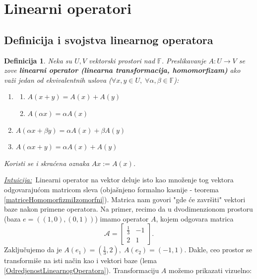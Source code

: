 \documentclass[a4paper,12pt,twoside]{report}
\newtheorem{definition}{Definicija}[section]
\numberwithin{algorithm}{section}
\newcommand{\intuicija}{\noindent\underline{\textit{Intuicija:}}\ }
\begin{document}
\newpage

\section{Linearni operatori}

\subsection{Definicija i svojstva linearnog operatora}
\label{linearniOperator}

\begin{definition}
    Neka su $U, V$ vektorski prostori nad $\mathbb{F}$. Preslikavanje $A: U \to V$ se zove \textbf{linearni operator (linearna transformacija, homomorfizam)} ako važi jedan od
    ekvivalentnih uslova ($\forall x, y \in U, \; \forall \alpha, \beta \in \mathbb{F}$):
    \begin{enumerate}
        \item \begin{enumerate}
            \item $A(x + y) = A(x) + A(y)$
            \item $A(\alpha x) = \alpha A(x)$
        \end{enumerate}
        \item $A(\alpha x + \beta y) = \alpha A(x) + \beta A(y)$
        \item $A(\alpha x + y) = \alpha A(x) + A(y)$
    \end{enumerate}
    Koristi se i skraćena oznaka $Ax := A(x)$.
\end{definition}
\vfill
\intuicija Linearni operator na vektor deluje isto kao množenje tog vektora odgovarajućom matricom sleva (objašnjeno formalno kasnije - teorema 
\ref{matriceHomomorfizmiIzomorfni}). Matrica nam govori "{gde će završiti}" vektori baze nakon primene operatora. Na primer, recimo da u dvodimenzionom 
prostoru (baza $e = ((1, 0), (0, 1))$) imamo operator $A$, 
kojem odgovara matrica \[ \mathcal{A} = \begin{bmatrix}
    \frac{1}{3} & -1 \\[6pt]
    2           &  1
\end{bmatrix}. \] Zaključujemo da je $A(e_1) = (\frac{1}{3}, 2), \; A(e_2) = (-1, 1)$. Dakle, ceo prostor se transformiše na isti način kao i vektori 
baze (lema \ref{OdredjenostLinearnogOperatora}). Transformaciju $A$ možemo prikazati vizuelno:
\end{document}
